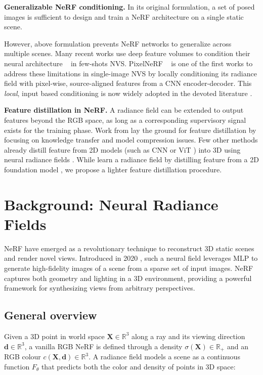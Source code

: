 \noindent\textbf{Generalizable NeRF conditioning.} In its original formulation, a set of posed images is sufficient to design and train a \ac{NeRF} architecture on a single static scene.

However, above formulation prevents \ac{NeRF} networks to generalize across multiple scenes. Many recent works use deep feature volumes to condition their neural architecture ~\citep{wang2021ibrnet,chen2023matchnerf} in few-shots \ac{NVS}. PixelNeRF ~\citep{yu2021pixelnerf} is one of the first works to address these limitations in single-image \ac{NVS} by locally conditioning its radiance field with pixel-wise, source-aligned features from a \ac{CNN} encoder-decoder. This \textit{local}, input based conditioning is now widely adopted in the devoted literature \citep{jang2021codenerf,li2022symmnerf,lin2023vision}.

\noindent\textbf{Feature distillation in NeRF.} A radiance field can be extended to output features beyond the RGB space, as long as a corresponding supervisory signal exists for the training phase. Work from \citep{hinton2015distilling} lay the ground for feature distillation by focusing on knowledge transfer and model compression issues. Few other methods already distill feature from 2D models (such as \ac{CNN} or {ViT} \citep{dosovitskiy2020vit}) into 3D using neural radiance fields \citep{kobayashi2022decomposing}. While \citep{ye2023featurenerf} learn a radiance field  by distilling feature from a 2D foundation model \citep{oquab2023dinov2}, we propose a lighter feature distillation procedure. 

\section{Background: Neural Radiance Fields}


\ac{NeRF} have emerged as a revolutionary technique to reconstruct 3D static scenes and render novel views. Introduced in 2020 \citep{mildenhall2020nerf}, such a neural field leverages \ac{MLP} to generate high-fidelity images of a scene from a sparse set of input images. \ac{NeRF} captures both geometry and lighting in a 3D environment, providing a powerful framework for synthesizing views from arbitrary perspectives.

\subsection{General overview}

Given a 3D point in world space $\mathbf{X} \in \mathbb{R}^{3}$ along a ray and its viewing direction $\mathbf{d} \in \mathbb{R}^{3}$, a vanilla RGB \ac{NeRF} is defined through a density $\sigma(\mathbf{X})\in \mathbb{R}_{+}$  and an RGB colour $c(\mathbf{X},\mathbf{d}) \in \mathbb{R}^{3}$. A radiance field models a scene as a continuous function $F_{\theta}$ that predicts both the color and density of points in 3D space: 

